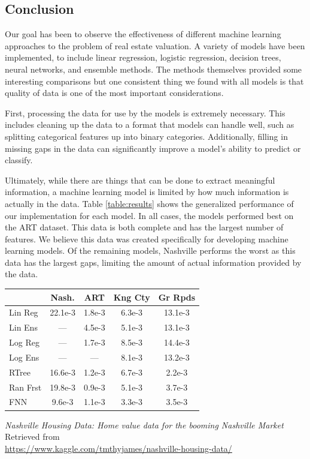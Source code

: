 \documentclass[10pt]{article}
\begin{document}
\begin{multicols}{2}
 		\section{Conclusion}
 		Our goal has been to observe the effectiveness of different machine learning approaches to the problem of real estate valuation. A variety of models have been implemented, to include linear regression, logistic regression, decision trees, neural networks, and ensemble methods. The methods themselves provided some interesting comparisons but one consistent thing we found with all models is that quality of data is one of the most important considerations.

		First, processing the data for use by the models is extremely necessary. This includes cleaning up the data to a format that models can handle well, such as splitting categorical features up into binary categories. Additionally, filling in missing gaps in the data can significantly improve a model's ability to predict or classify.

		Ultimately, while there are things that can be done to extract meaningful information, a machine learning model is limited by how much information is actually in the data.  Table \ref{table:results} shows the generalized performance of our implementation for each model.  In all cases, the models performed best on the ART dataset.  This data is both complete and has the largest number of features.  We believe this data was created specifically for developing machine learning models.  Of the remaining models, Nashville performs the worst as this data has the largest gaps, limiting the amount of actual information provided by the data.
		
		\begin{center}
	        \captionsetup{type=table}
	        \begin{tabular}{l|c|c|c|c}
	        	        & Nash.   & ART     & Kng Cty & Gr Rpds  \\
	        	\hline
	        	Lin Reg & 22.1e-3 & 1.8e-3  & 6.3e-3  & 13.1e-3  \\
	        	Lin Ens & ---     & 4.5e-3  & 5.1e-3  & 13.1e-3  \\
	        	Log Reg & ---     & 1.7e-3  & 8.5e-3  & 14.4e-3  \\
	        	Log Ens & ---     & ---     & 8.1e-3  & 13.2e-3  \\
	        	RTree  & 16.6e-3 & 1.2e-3 & 6.7e-3 & 2.2e-3  \\
	        	Ran Frst  & 19.8e-3 & 0.9e-3 & 5.1e-3 & 3.7e-3  \\
	        	FNN     & 9.6e-3  & 1.1e-3  & 3.3e-3  & 3.5e-3   \\	        	
	        \end{tabular}
			\label{table:results}
		\end{center}
		\begin{thebibliography}{13}
			\textit{Nashville Housing Data: Home value data for the booming Nashville Market}
			Retrieved from \\ \small{\url{https://www.kaggle.com/tmthyjames/nashville-housing-data/}}
			

\end{thebibliography}
\end{multicols}
\end{document}
